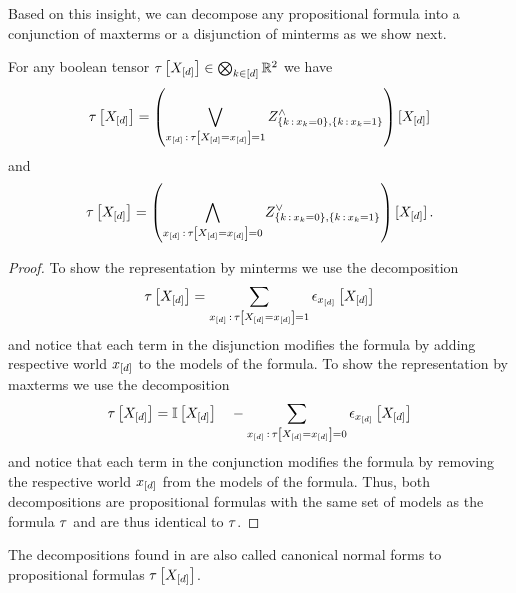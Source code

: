 Based on this insight, we can decompose any propositional formula into a conjunction of maxterms or a disjunction of minterms as we show next.

\begin{theorem}
    \label{the:tensorToMaxMinTerms}
    For any boolean tensor $\tau\left[X_{[d]}\right]\in\bigotimes_{k\in[d]}\mathbb{R}^2$  we have
    \begin{align*}
        \tau\left[X_{[d]}\right] = \left( \bigvee_{x_{[d]}\,:\,\tau\left[X_{[d]}=x_{[d]}\right] = 1}
        Z^{\land}_{\{k\,:\,x_{k}=0\},\{k\,:\,x_{k}=1\}}
        \right)
        [X_{[d]}]
    \end{align*}
    and
    \begin{align*}
        \tau\left[X_{[d]}\right] = \left( \bigwedge_{x_{[d]}\,:\,\tau\left[X_{[d]}=x_{[d]}\right] = 0}
        Z^{\lor}_{\{k\,:\,x_{k}=0\},\{k\,:\,x_{k}=1\}}
        \right)
        [X_{[d]}] \, .
    \end{align*}
\end{theorem}
\begin{proof}
    To show the representation by minterms we use the decomposition
    \begin{align*}
        \tau\left[X_{[d]}\right]  = \sum_{x_{[d]}\,:\,\tau\left[X_{[d]}=x_{[d]}\right] = 1} \epsilon_{x_{[d]}}\left[X_{[d]}\right]
    \end{align*}
    and notice that each term in the disjunction modifies the formula by adding respective world $x_{[d]}$ to the models of the formula.
    To show the representation by maxterms we use the decomposition
    \begin{align*}
        \tau\left[X_{[d]}\right]  = \mathbb{I}\left[X_{[d]}\right] \quad - \sum_{x_{[d]}\,:\,\tau\left[X_{[d]}=x_{[d]}\right] = 0} \epsilon_{x_{[d]}}\left[X_{[d]}\right]
    \end{align*}
    and notice that each term in the conjunction modifies the formula by removing the respective world $x_{[d]}$ from the models of the formula.
    Thus, both decompositions are propositional formulas with the same set of models as the formula $\tau$ and are thus identical to $\tau$.
\end{proof}


The decompositions found in  are also called canonical normal forms to propositional formulas $\tau\left[X_{[d]}\right]$.

